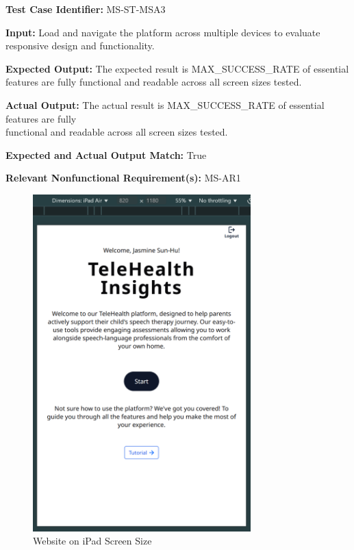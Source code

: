 \documentclass[12pt, titlepage]{article}
\begin{document}
\begin{mdframed}[linewidth=0.5mm] \par
  \textbf{Test Case Identifier:} MS-ST-MSA3 \par
  \textbf{Input:} Load and navigate the platform across multiple devices to evaluate responsive design and functionality. \par
  \textbf{Expected Output:} The expected result is MAX\_SUCCESS\_RATE of essential features are fully functional and readable across all screen sizes tested. \par
  \textbf{Actual Output:} The actual result is MAX\_SUCCESS\_RATE of essential features are fully \\functional and readable across all screen sizes tested. \par
  \textbf{Expected and Actual Output Match:} True \par
  \textbf{Relevant Nonfunctional Requirement(s):} MS-AR1
\end{mdframed}

\begin{figure}[p]
  \centering
  \includegraphics[width=0.75\textwidth]{images/TIscreensizeIpad.png}
  \caption{Website on iPad Screen Size}
\end{figure}
\end{document}
